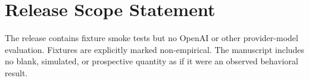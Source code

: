 \documentclass[10pt,twocolumn]{article}
\begin{document}
\par\vspace{1.2ex}
\section{Release Scope Statement}

The release contains fixture smoke tests but no OpenAI or other provider-model evaluation.
Fixtures are explicitly marked non-empirical. The manuscript includes no blank,
simulated, or prospective quantity as if it were an observed behavioral result.
\end{document}

